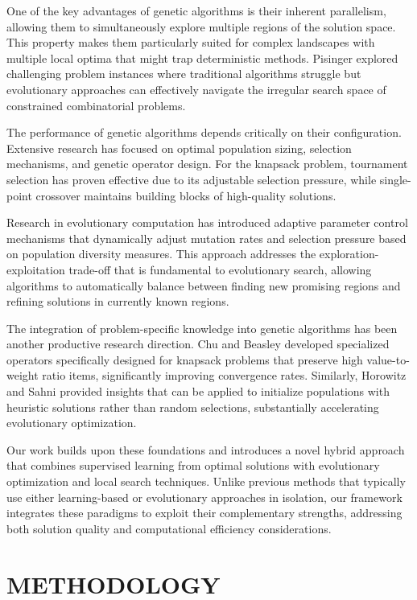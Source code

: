 \documentclass[conference, a4paper]{IEEEtran}
\begin{document}
One of the key advantages of genetic algorithms is their inherent parallelism, allowing them to simultaneously explore multiple regions of the solution space. This property makes them particularly suited for complex landscapes with multiple local optima that might trap deterministic methods. Pisinger \cite{pisinger2005hard} explored challenging problem instances where traditional algorithms struggle but evolutionary approaches can effectively navigate the irregular search space of constrained combinatorial problems.

The performance of genetic algorithms depends critically on their configuration. Extensive research has focused on optimal population sizing, selection mechanisms, and genetic operator design. For the knapsack problem, tournament selection has proven effective due to its adjustable selection pressure, while single-point crossover maintains building blocks of high-quality solutions.

Research in evolutionary computation has introduced adaptive parameter control mechanisms that dynamically adjust mutation rates and selection pressure based on population diversity measures. This approach addresses the exploration-exploitation trade-off that is fundamental to evolutionary search, allowing algorithms to automatically balance between finding new promising regions and refining solutions in currently known regions.

The integration of problem-specific knowledge into genetic algorithms has been another productive research direction. Chu and Beasley \cite{chu1998genetic} developed specialized operators specifically designed for knapsack problems that preserve high value-to-weight ratio items, significantly improving convergence rates. Similarly, Horowitz and Sahni \cite{horowitz1974computing} provided insights that can be applied to initialize populations with heuristic solutions rather than random selections, substantially accelerating evolutionary optimization.

Our work builds upon these foundations and introduces a novel hybrid approach that combines supervised learning from optimal solutions with evolutionary optimization and local search techniques. Unlike previous methods that typically use either learning-based or evolutionary approaches in isolation, our framework integrates these paradigms to exploit their complementary strengths, addressing both solution quality and computational efficiency considerations.

\section{METHODOLOGY}
\end{document}
